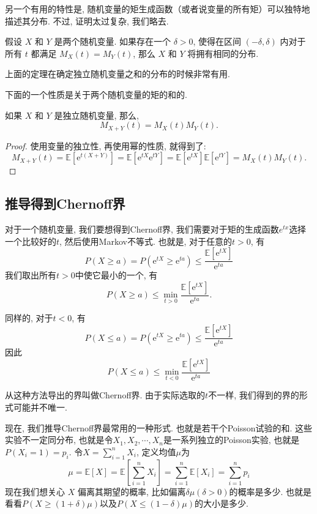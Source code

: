 另一个有用的特性是, 随机变量的矩生成函数（或者说变量的所有矩）可以独特地描述其分布. 
不过, 证明太过复杂, 我们略去. 

\begin{theorem}
假设 $X$ 和 $Y$ 是两个随机变量. 如果存在一个 $\delta > 0$, 使得在区间 $(-\delta, \delta)$ 内对于所有 $t$ 都满足
$M_X(t) = M_Y(t)$, 那么 $X$ 和 $Y$ 将拥有相同的分布. 

\end{theorem}

上面的定理在确定独立随机变量之和的分布的时候非常有用. 

下面的一个性质是关于两个随机变量的矩的和的. 
\begin{theorem}
    如果 $X$ 和 $Y$ 是独立随机变量, 那么, $$M_{X+Y}(t)=M_X(t) M_Y(t).$$
\end{theorem}

\begin{proof}
    使用变量的独立性, 再使用幂的性质, 就得到了:$$M_{X+Y}(t)=\mathbb{E}\left[\mathrm{e}^{t(X+Y)}\right]=\mathbb{E}\left[\mathrm{e}^{t X} \mathrm{e}^{t Y}\right]=\mathbb{E}\left[\mathrm{e}^{t X}\right] \mathbb{E}\left[\mathrm{e}^{t Y}\right]=M_X(t) M_Y(t).$$
\end{proof}

\subsection{推导得到Chernoff界}

对于一个随机变量, 我们要想得到Chernoff界, 我们需要对于矩的生成函数$e^{tx}$选择一个比较好的$t$, 然后使用Markov不等式. 也就是, 对于任意的$t>0$, 有$$P(X \geq a)=P\left(\mathrm{e}^{t X} \geq \mathrm{e}^{t a}\right) \leq \frac{\mathbb{E}\left[\mathrm{e}^{t X}\right]}{\mathrm{e}^{t a}}$$我们取出所有$t>0$中使它最小的一个, 有$$
P(X \geq a) \leq \min _{t>0} \frac{\mathbb{E}\left[\mathrm{e}^{t X}\right]}{\mathrm{e}^{t a}}.$$

同样的, 对于$t<0$, 有
$$
P(X \leq a)=P\left(\mathrm{e}^{t X} \geq \mathrm{e}^{t a}\right) \leq \frac{\mathbb{E}\left[\mathrm{e}^{t X}\right]}{\mathrm{e}^{t a}}
$$
因此
$$
P(X \leq a) \leq \min _{t<0} \frac{\mathbb{E}\left[\mathrm{e}^{t X}\right]}{\mathrm{e}^{t a}}
$$

从这种方法导出的界叫做Chernoff界. 由于实际选取的$t$不一样, 我们得到的界的形式可能并不唯一. 

现在, 我们推导Chernoff界最常用的一种形式. 也就是若干个Poisson试验的和. 这些实验不一定同分布,  也就是令$X_1, X_2, \cdots, X_n$是一系列独立的Poisson实验, 也就是$P\left(X_i=1\right)=p_i$. 令$X=\sum_{i=1}^n X_i$, 定义均值$\mu$为
$$
\mu=\mathbb{E}[X]=\mathbb{E}\left[\sum_{i=1}^n X_i\right]=\sum_{i=1}^n \mathbb{E}\left[X_i\right]=\sum_{i=1}^n p_i
$$
现在我们想关心 $X$ 偏离其期望的概率, 比如偏离$\delta \mu(\delta>0)$的概率是多少.  也就是看看$P(X \geq(1+\delta) \mu)$以及$P(X \leq(1-\delta) \mu)$的大小是多少.

